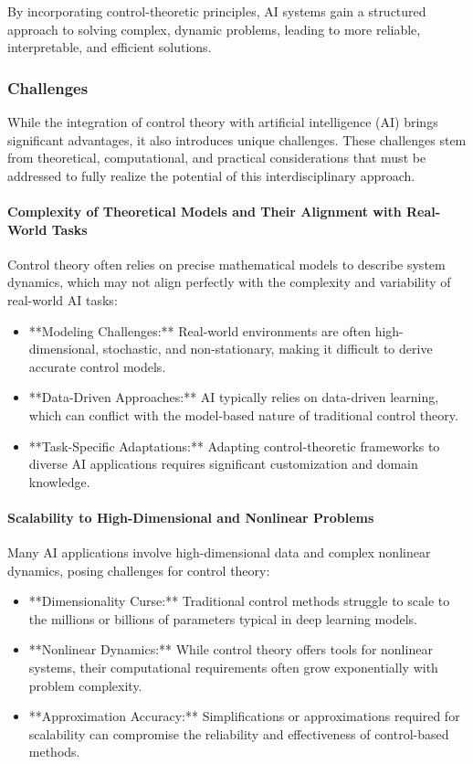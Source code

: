 \documentclass{IEEEojcsys}
\begin{document}
By incorporating control-theoretic principles, AI systems gain a structured approach to solving complex, dynamic problems, leading to more reliable, interpretable, and efficient solutions.

\subsubsection{Challenges}

While the integration of control theory with artificial intelligence (AI) brings significant advantages, it also introduces unique challenges. These challenges stem from theoretical, computational, and practical considerations that must be addressed to fully realize the potential of this interdisciplinary approach.

\paragraph{Complexity of Theoretical Models and Their Alignment with Real-World Tasks}
Control theory often relies on precise mathematical models to describe system dynamics, which may not align perfectly with the complexity and variability of real-world AI tasks:
\begin{itemize}
    \item **Modeling Challenges:** Real-world environments are often high-dimensional, stochastic, and non-stationary, making it difficult to derive accurate control models.
    \item **Data-Driven Approaches:** AI typically relies on data-driven learning, which can conflict with the model-based nature of traditional control theory.
    \item **Task-Specific Adaptations:** Adapting control-theoretic frameworks to diverse AI applications requires significant customization and domain knowledge.
\end{itemize}

\paragraph{Scalability to High-Dimensional and Nonlinear Problems}
Many AI applications involve high-dimensional data and complex nonlinear dynamics, posing challenges for control theory:
\begin{itemize}
    \item **Dimensionality Curse:** Traditional control methods struggle to scale to the millions or billions of parameters typical in deep learning models.
    \item **Nonlinear Dynamics:** While control theory offers tools for nonlinear systems, their computational requirements often grow exponentially with problem complexity.
    \item **Approximation Accuracy:** Simplifications or approximations required for scalability can compromise the reliability and effectiveness of control-based methods.
\end{itemize}
\end{document}
